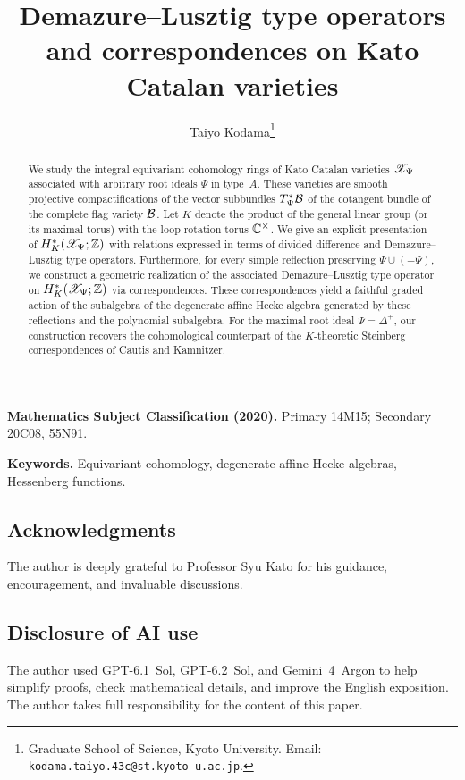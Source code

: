 \documentclass[11pt]{article}
\begin{document}
\title{Demazure--Lusztig type operators\\
and correspondences on Kato Catalan varieties}
\author{Taiyo Kodama\thanks{Graduate School of Science, Kyoto University. Email: \texttt{kodama.taiyo.43c@st.kyoto-u.ac.jp}.}}
\date{}
\maketitle
\begin{abstract}
We study the integral equivariant cohomology rings of Kato Catalan varieties $\mathscr X_\Psi$ associated with arbitrary root ideals $\Psi$ in type~$A$.
These varieties are smooth projective compactifications of the vector subbundles $T^*_\Psi\mathcal B$ of the cotangent bundle of the complete flag variety $\mathcal B$.
Let $K$ denote the product of the general linear group (or its maximal torus) with the loop rotation torus $\mathbb C^\times$.
We give an explicit presentation of $H^*_K(\mathscr X_\Psi;\mathbb Z)$ with relations expressed in terms of divided difference and Demazure--Lusztig type operators.
Furthermore, for every simple reflection preserving $\Psi\cup(-\Psi)$, we construct a geometric realization of the associated Demazure--Lusztig type operator on $H^*_K(\mathscr X_\Psi;\mathbb Z)$ via correspondences.
These correspondences yield a faithful graded action of the subalgebra of the degenerate affine Hecke algebra generated by these reflections and the polynomial subalgebra.
For the maximal root ideal $\Psi=\Delta^+$, our construction recovers the cohomological counterpart of the $K$-theoretic Steinberg correspondences of Cautis and Kamnitzer.
\end{abstract}
\noindent\textbf{Mathematics Subject Classification (2020).}
Primary 14M15; Secondary 20C08, 55N91.
\smallskip

\noindent\textbf{Keywords.}
Equivariant cohomology, degenerate affine Hecke algebras, Hessenberg functions.









\subsection*{Acknowledgments}
The author is deeply grateful to Professor Syu Kato for his guidance, encouragement, and invaluable discussions.

\subsection*{Disclosure of AI use}
The author used GPT-6.1~Sol, GPT-6.2~Sol, and Gemini~4~Argon
to help simplify proofs, check mathematical details, and improve
the English exposition. The author takes full responsibility
for the content of this paper.

\printbibliography
\end{document}
